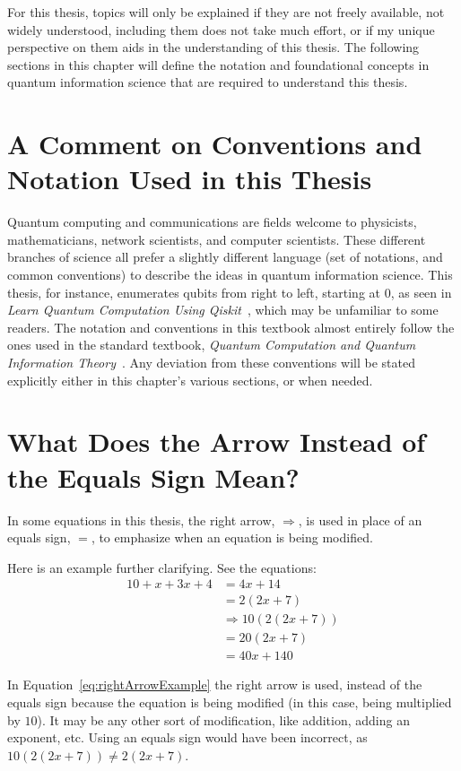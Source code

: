 For this thesis, topics will only be explained if they are not freely available, not widely understood, including them does not take much effort, or if my unique perspective on them aids in the understanding of this thesis. The following sections in this chapter will define the notation and foundational concepts in quantum information science that are required to understand this thesis.
\section{A Comment on Conventions and Notation Used in this Thesis}
Quantum computing and communications are fields welcome to physicists, mathematicians, network scientists, and computer scientists. These different branches of science all prefer a slightly different language (set of notations, and common conventions) to describe the ideas in quantum information science. This thesis, for instance, enumerates qubits from right to left, starting at 0, as seen in \emph{Learn Quantum Computation Using Qiskit}~\cite{Qiskit-Textbook}, which may be unfamiliar to some readers. The notation and conventions in this textbook almost entirely follow the ones used in the standard textbook, \emph{Quantum Computation and Quantum Information Theory}~\cite{nielsen2002quantum}. Any deviation from these conventions will be stated explicitly either in this chapter's various sections, or when needed.
\section{What Does the Arrow Instead of the Equals Sign Mean?}
\label{sec:whatDoesTheArrowInsteadOfEqualsSignMean}
In some equations in this thesis, the right arrow, $\Rightarrow$, is used in place of an equals sign, $=$, to emphasize when an equation is being modified.
\begin{example}
Here is an example further clarifying. See the equations:
\begin{align}
10 + x + 3x + 4 &= 4x + 14\\
&=2(2x + 7)\\
&\Rightarrow 10(2(2x + 7))\label{eq:rightArrowExample}\\
&= 20(2x + 7)\\
&=40x + 140
\end{align}
\end{example}
In Equation~\eqref{eq:rightArrowExample} the right arrow is used, instead of the equals sign because the equation is being modified (in this case, being multiplied by $10$). It may be any other sort of modification, like addition, adding an exponent, etc. Using an equals sign would have been incorrect, as $10(2(2x + 7)) \neq 2(2x + 7)$.
